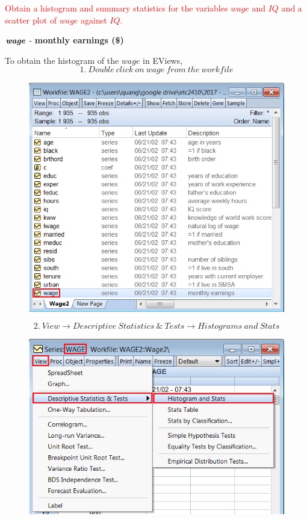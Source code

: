 \documentclass[12pt]{report}
\begin{document}
\noindent \textcolor{red}{Obtain a histogram and summary statistics for the variables $wage$ and $IQ$ and a scatter plot of $wage$ against $IQ$.}
\begin{center}
\noindent $\textbf{\textit{wage}}$ - \textbf{monthly earnings (\$)}
\end{center}
\noindent To obtain the histogram of the $wage$ in EViews,
$$1.\ Double\ click\ on\ wage\ from\ the\ workfile$$
\begin{figure}[H]
\centering
\includegraphics{q3_1}
\end{figure}
\vspace{-\baselineskip}
$$2.\ View \to Descriptive\ Statistics\ \&\ Tests \to Histograms\ and\ Stats$$
\begin{figure}[H]
\centering
\includegraphics{q3_2}
\end{figure}
\end{document}
